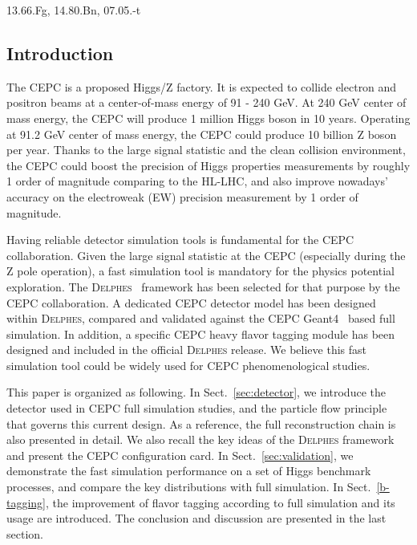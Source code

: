 \documentclass[a4paper,10pt,twoside]{cpc-hepnp}
\begin{document}
\begin{pacs}
13.66.Fg, 14.80.Bn, 07.05.-t
\end{pacs}

%

\begin{multicols}{2}


\section{Introduction}\label{sec:intro}

The CEPC\cite{ref:cepc_det, ref:cepc_acc} is a proposed Higgs/Z factory. 
It is expected to collide electron and positron beams at a center-of-mass energy of 91 - 240 GeV.
At 240 GeV center of mass energy, the CEPC will produce 1 million Higgs boson in 10 years.
Operating at 91.2 GeV center of mass energy, the CEPC could produce 10 billion Z boson per year.
Thanks to the large signal statistic and the clean collision environment, the CEPC could boost the precision of Higgs properties measurements by roughly 1 order of magnitude comparing to the HL-LHC, 
and also improve nowadays' accuracy on the electroweak (EW) precision measurement by 1 order of magnitude\cite{ref:cepc_det}. 

Having reliable detector simulation tools is fundamental for the CEPC collaboration. 
Given the large signal statistic at the CEPC (especially during the Z pole operation), 
a fast simulation tool is mandatory for the physics potential exploration. %
The {\textsc{Delphes}~}\cite{ref:delphes} framework has been selected for that purpose by the CEPC collaboration. 
A dedicated CEPC detector model has been designed within {\textsc{Delphes}}, compared and validated against the CEPC Geant4~\cite{ref:geant4} based full simulation. 
In addition, a specific CEPC heavy flavor tagging module has been designed and included in the official {\textsc{Delphes}} release. 
We believe this fast simulation tool could be widely used for CEPC phenomenological studies. 

This paper is organized as following.  
In Sect.{~\ref{sec:detector}}, we introduce the detector used in CEPC full simulation studies, 
and the particle flow principle that governs this current design. 
As a reference, the full reconstruction chain is also presented in detail. 
We also recall the key ideas of the {\textsc{Delphes}} framework and present the CEPC configuration card. 
In Sect.{~\ref{sec:validation}}, we demonstrate the fast simulation performance on a set of Higgs benchmark processes, and compare the key distributions with full simulation.
In Sect.{~\ref{b-tagging}}, the improvement of flavor tagging according to full simulation and its usage are introduced.
The conclusion and discussion are presented in the last section. 


\end{multicols}
\end{document}
